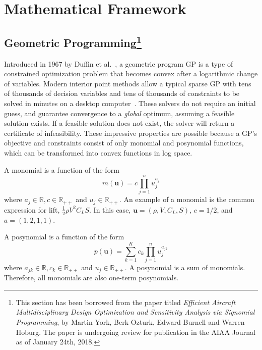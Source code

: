 \chapter{Mathematical Framework}

\section[Geometric Programming]{Geometric Programming\footnote{This section has been borrowed from the paper
titled \textit{Efficient Aircraft Multidisciplinary Design Optimization and Sensitivity Analysis via Signomial Programming},
by Martin York, Berk Ozturk, Edward Burnell and Warren Hoburg.
The paper is undergoing review for publication in the AIAA Journal as of January 24th, 2018.}}
\label{a:gpintro}

Introduced in 1967 by Duffin et al.~\cite{duffingp}, a geometric program \gls{GP} is
a type of constrained optimization problem that becomes convex after a
logarithmic change of variables. Modern interior point methods allow a typical
sparse \gls{GP} with tens of thousands of decision variables and tens of thousands of
constraints to be solved in minutes on a desktop computer~\cite{convex}. These
solvers do not require an initial guess, and guarantee convergence to a
\textit{global} optimum, assuming a feasible solution exists. If a feasible
solution does not exist, the solver will return a certificate of infeasibility.
These impressive properties are possible because a GP's objective and
constraints consist of only monomial and posynomial functions, which can be
transformed into convex functions in log space.

A monomial is a function of the form
\begin{equation}\label{e:monomial}
m(\mathbf{u}) = c\prod_{j=1}^{n} u_{j}^{a_{j}}
\end{equation}
where $a_{j} \in \mathbb{R}, c \in \mathbb{R}_{++}$ and $u_{j} \in
\mathbb{R_{++}}$. An example of a monomial is the common expression for lift,
$\frac{1}{2} \rho V^2C_{L}S$. In this case, $\mathbf{u} = (\rho, V, C_{L}, S)$,
$c= 1/2$, and $a = (1, 2, 1, 1)$.

A posynomial is a function of the form
\begin{equation}\label{e:posynomial}
p(\mathbf{u}) = \sum_{k=1}^{K}c_{k}\prod_{j=1}^{n} u_{j}^{a_{jk}}
\end{equation}
where $a_{jk} \in \mathbb{R}, c_{k} \in \mathbb{R}_{++}$ and $u_{j} \in
\mathbb{R_{++}}$. A posynomial is a sum of monomials. Therefore, all monomials
are also one-term posynomials.

